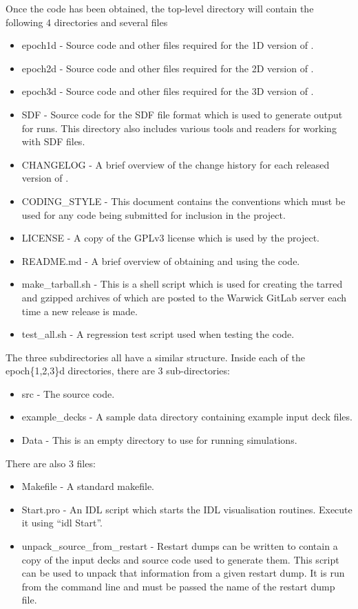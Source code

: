 Once the code has been obtained, the top-level directory will contain the
following 4 directories and several files
\begin{itemize}
\item epoch1d - Source code and other files required for the 1D version of
  {\EPOCH}.
\item epoch2d - Source code and other files required for the 2D version of
  {\EPOCH}.
\item epoch3d - Source code and other files required for the 3D version of
  {\EPOCH}.
\item SDF - Source code for the SDF file format which is used to generate
  output for {\EPOCH} runs. This directory also includes various tools
  and readers for working with SDF files.
\item CHANGELOG - A brief overview of the change history for each
  released version of {\EPOCH}.
\item CODING\_STYLE - This document contains the conventions which must be
  used for any code being submitted for inclusion in the {\EPOCH} project.
\item LICENSE - A copy of the GPLv3 license which is used by the {\EPOCH}
  project.
\item README.md - A brief overview of obtaining and using the {\EPOCH} code.
\item make\_tarball.sh - This is a shell script which is used for creating
  the tarred and gzipped archives of {\EPOCH} which are posted to the Warwick
  GitLab server each time a new release is made.
\item test\_all.sh - A regression test script used when testing the code.
\end{itemize}

The three {\EPOCH} subdirectories all have a similar structure. Inside each
of the epoch\{1,2,3\}d directories, there are 3 sub-directories:

\begin{itemize}
\item src - The {\EPOCH} source code.
\item example\_decks - A sample data directory containing example input deck
  files.
\item Data - This is an empty directory to use for running simulations.
\end{itemize}

There are also 3 files:

\begin{itemize}
\item Makefile - A standard makefile.
\item Start.pro - An IDL script which starts the IDL visualisation
  routines. Execute it using ``idl Start''.
\item unpack\_source\_from\_restart - Restart dumps can be written to contain
  a copy of the input decks and source code used to generate them. This script
  can be used to unpack that information from a given restart dump. It is run
  from the command line and must be passed the name of the restart dump file.
\end{itemize}


